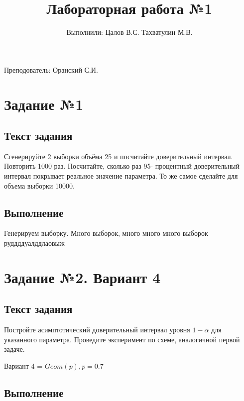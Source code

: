 \documentclass{article}
\title{Лабораторная работа №1}
\author{Выполнили: Цалов В.С. Тахватулин М.В.}
\begin{document}
\maketitle
\begin{center}
      {\fontsize{14}{15}\selectfont
            Преподователь: Оранский С.И.
      }
\end{center}


\section{Задание №1}\label{sec:-no1}
\subsection{Текст задания}
Сгенерируйте 2 выборки объёма 25 и посчитайте доверительный интервал. Повторить 1000 раз. Посчитайте, сколько раз 95-
процентный доверительный интервал покрывает реальное значение параметра. То же самое
сделайте для объема выборки 10000.

\subsection{Выполнение}
Генерируем выборку. 
Много выборок, много много много выборок
руддддуалддлаовыж

\section{Задание №2. Вариант 4}
\subsection{Текст задания}
Постройте асимптотический доверительный интервал уровня $1 - \alpha$ для указанного параметра. Проведите эксперимент по схеме, аналогичной первой задаче.

Вариант 4 = $Geom(p), p = 0.7$
\subsection{Выполнение}
\end{document}
